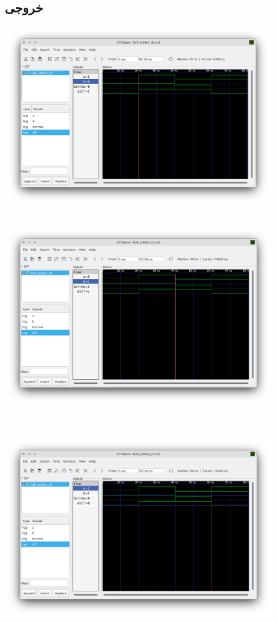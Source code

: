 \documentclass[dvipsnames, svgnames, x11names, a4paper, 11pt, oneside]{book}
\begin{document}
				\subsection{خروجی }
					\begin{center}
						\includegraphics[width=12cm, height=8cm]{./images/half_subber_vcd_1}
					\end{center}
					
					\begin{center}
						\includegraphics[width=12cm, height=9cm]{./images/half_subber_vcd_2}
					\end{center}
					\begin{center}
						\includegraphics[width=12cm, height=9cm]{./images/half_subber_vcd_3}
					\end{center}
									
\end{document}
